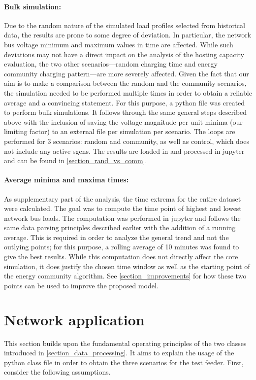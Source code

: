 \documentclass[a4paper,10pt]{report}
\begin{document}
\paragraph{Bulk simulation:} Due to the random nature of the simulated load profiles selected from historical data, the results are prone to some degree of deviation. In particular, the network bus voltage minimum and maximum values in time are affected. While such deviations may not have a direct impact on the analysis of the hosting capacity evaluation, the two other scenarios---random charging time and energy community charging pattern---are more severely affected. Given the fact that our aim is to make a comparison between the random and the community scenarios, the simulation needed to be performed multiple times in order to obtain a reliable average and a convincing statement. For this purpose, a python file was created to perform bulk simulations. It follows through the same general steps described above with the inclusion of saving the voltage magnitude per unit minima (our limiting factor) to an external file per simulation per scenario. The loops are performed for 3 scenarios: random and community, as well as control, which does not include any active sgens. The results are loaded in and processed in jupyter and can be found in \cref{section_rand_vs_comm}.

\paragraph{Average minima and maxima times:} As supplementary part of the analysis, the time extrema for the entire dataset were calculated. The goal was to compute the time point of highest and lowest network bus loads. The computation was performed in jupyter and follows the same data parsing principles described earlier with the addition of a running average. This is required in order to analyze the general trend and not the outlying points; for this purpose, a rolling average of 10 minutes was found to give the best results. While this computation does not directly affect the core simulation, it does justify the chosen time window as well as the starting point of the energy community algorithm. See \cref{section_improvements} for how these two points can be used to improve the proposed model.

\newpage
\section{Network application}\label{section_network_application}
This section builds upon the fundamental operating principles of the two classes introduced in \cref{section_data_processing}. It aims to explain the usage of the python class file in order to obtain the three scenarios for the test feeder. First, consider the following assumptions.
\end{document}
